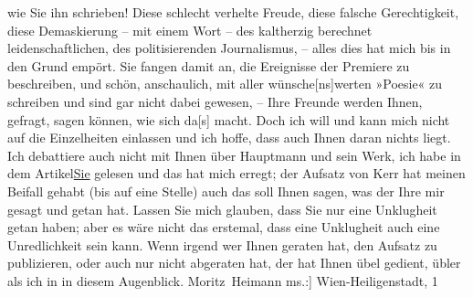 \begin{ledgroupsized}[t]{13cm}
               wie Sie ihn schrieben! Diese schlecht verhelte Freude, diese falsche Gerechtigkeit,
               diese Demaskierung – mit einem Wort – des kaltherzig berechnet leidenschaftlichen,
               des politisierenden Journalismus, – alles dies hat mich bis in den Grund empört. Sie
               fangen damit an, die Ereignisse der Premiere zu beschreiben, und schön, anschaulich,
               mit aller wünsche{[}ns{]}werten »Poesie« zu schreiben und sind gar
               nicht dabei gewesen, – Ihre Freunde werden Ihnen, gefragt, sagen können, wie sich
                  da{[}s{]} macht. Doch ich will und kann mich nicht auf die
               Einzelheiten einlassen und ich hoffe, dass auch Ihnen daran nichts liegt. Ich
               debattiere auch nicht mit Ihnen über Hauptmann
               und sein Werk, ich habe in dem Artikel\uline{Sie}
               gelesen und das hat mich erregt; der Aufsatz von Kerr hat meinen Beifall
               gehabt (bis auf eine Stelle) auch das soll Ihnen sagen, was der Ihre mir gesagt und
               getan hat.\pend
           \pstart
           Lassen Sie mich glauben, dass Sie nur eine Unklugheit getan haben; aber es wäre nicht
               das erstemal, dass eine Unklugheit auch eine Unredlichkeit sein kann. Wenn irgend wer
               Ihnen geraten hat, den Aufsatz zu publizieren, oder auch nur nicht abgeraten hat, der
               hat Ihnen übel gedient, übler als ich in in diesem Augenblick.\pend
           \pstart \spacefill\mbox{Moritz Heimann}\pend{}{\bigskip}\pstart
           \raggedleft{}{\pb}{[}ms.:{]} Wien-Heiligenstadt, 1\label{K_L03438-11v}
\end{ledgroupsized}
